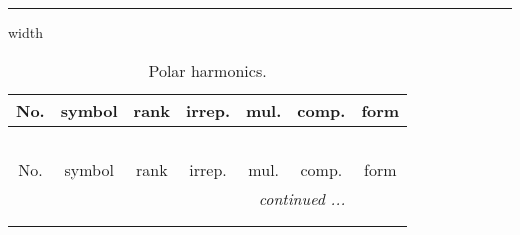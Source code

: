 \documentclass[fleqn,10pt,landscape]{article}
\begin{document}
\begin{itemize}
 \hfil \hrule height 1mm width \textwidth \hfil

\begin{center}
\renewcommand{\arraystretch}{1.3}
\begin{longtable}{ccccccc}
\caption{Polar harmonics.}
 \\
 \hline \hline
No. & symbol & rank & irrep. & mul. & comp. & form \\ \hline \endfirsthead

\multicolumn{6}{l}{\tablename\ \thetable{}} \\
 \hline \hline
No. & symbol & rank & irrep. & mul. & comp. & form \\ \hline \endhead

 \hline \hline
\multicolumn{6}{r}{\footnotesize\it continued ...} \\ \endfoot

 \hline \hline
\multicolumn{6}{r}{} \\ \endlastfoot


\end{longtable}
\end{center}
\end{itemize}
\end{document}
